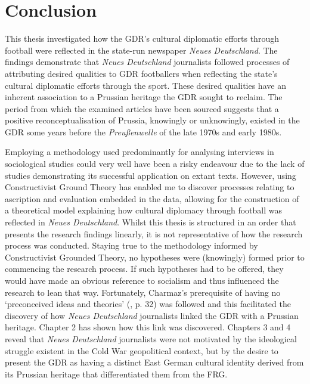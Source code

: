 \chapter{Conclusion\label{cha:conclusion}}

This thesis investigated how the GDR’s cultural diplomatic efforts through football were reflected in the state-run newspaper \textit{Neues Deutschland}. The findings demonstrate that \textit{Neues Deutschland} journalists followed processes of attributing desired qualities to GDR footballers when reflecting the state’s cultural diplomatic efforts through the sport. These desired qualities have an inherent association to a Prussian heritage the GDR sought to reclaim. The period from which the examined articles have been sourced suggests that a positive reconceptualisation of Prussia, knowingly or unknowingly, existed in the GDR some years before the \textit{Preußenwelle} of the late 1970s and early 1980s.

Employing a methodology used predominantly for analysing interviews in sociological studies could very well have been a risky endeavour due to the lack of studies demonstrating its successful application on extant texts. However, using Constructivist Ground Theory has enabled me to discover processes relating to ascription and evaluation embedded in the data, allowing for the construction of a theoretical model explaining how cultural diplomacy through football was reflected in \textit{Neues Deutschland}. Whilst this thesis is structured in an order that presents the research findings linearly, it is not representative of how the research process was conducted. Staying true to the methodology informed by Constructivist Grounded Theory, no hypotheses were (knowingly) formed prior to commencing the research process. If such hypotheses had to be offered, they would have made an obvious reference to socialism and thus influenced the research to lean that way. Fortunately, Charmaz’s prerequisite of having no ‘preconceived ideas and theories’ (\cite{charmaz2014}, p. 32) was followed and this facilitated the discovery of how \textit{Neues Deutschland} journalists linked the GDR with a Prussian heritage. Chapter 2 has shown how this link was discovered. Chapters 3 and 4 reveal that \textit{Neues Deutschland} journalists were not motivated by the ideological struggle existent in the Cold War geopolitical context, but by the desire to present the GDR as having a distinct East German cultural identity derived from its Prussian heritage that differentiated them from the FRG.

